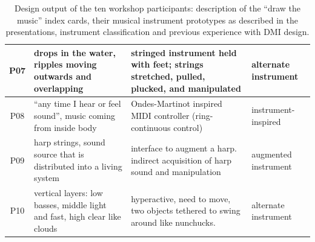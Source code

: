 \documentclass[]{interact}
\theoremstyle{plain}%
\theoremstyle{definition}
\theoremstyle{remark}
\begin{document}
\begin{table}[htbp]
\begin{centering}
\begin{tabular}{ c L{5.1cm} L{5.8cm} C{2.5cm} }
            P07 &
            drops in the water, ripples moving outwards and overlapping &
            stringed instrument held with feet; strings stretched, pulled, plucked, and manipulated &
            alternate instrument \\ \hline
            
            P08 &
            ``any time I hear or feel sound'', music coming from inside body &
            Ondes-Martinot inspired MIDI controller (ring-continuous control) &
            instrument-inspired \\ \hline
            
            P09 &
            harp strings, sound source that is distributed into a living system &
            interface to augment a harp. indirect acquisition of harp sound and manipulation &
            augmented instrument \\ \hline
            
            P10 &
            vertical layers: low basses, middle light and fast, high clear like clouds &
            hyperactive, need to move, two objects tethered to swing around like nunchucks. &
            alternate instrument \\ 
            \bottomrule
            
        \end{tabular}
        \caption[Design for Performance workshop: Design outputs]{Design output of the ten workshop participants: description of the ``draw the music'' index cards, their musical instrument prototypes as described in the presentations, instrument classification and previous experience with DMI design.}
        \label{ch3-tab:participant-outputs}
    \end{centering}
\end{table}

\end{document}
